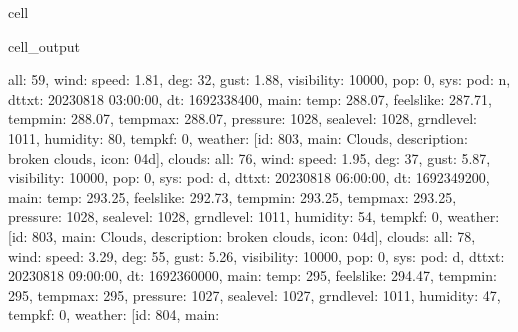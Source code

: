 \documentclass[letterpaper,10pt,english]{jupyterBook}
\begin{document}
\begin{sphinxuseclass}{cell}
\begin{sphinxVerbatimOutput}
\begin{sphinxuseclass}{cell_output}
\begin{sphinxVerbatim}[commandchars=\\\{\}]
\PYGZob{}\PYGZsq{}all\PYGZsq{}: 59\PYGZcb{}, \PYGZsq{}wind\PYGZsq{}: \PYGZob{}\PYGZsq{}speed\PYGZsq{}: 1.81, \PYGZsq{}deg\PYGZsq{}: 32, \PYGZsq{}gust\PYGZsq{}: 1.88\PYGZcb{}, \PYGZsq{}visibility\PYGZsq{}: 10000, \PYGZsq{}pop\PYGZsq{}: 0, \PYGZsq{}sys\PYGZsq{}: \PYGZob{}\PYGZsq{}pod\PYGZsq{}: \PYGZsq{}n\PYGZsq{}\PYGZcb{}, \PYGZsq{}dt\PYGZus{}txt\PYGZsq{}: \PYGZsq{}2023\PYGZhy{}08\PYGZhy{}18 03:00:00\PYGZsq{}\PYGZcb{}, \PYGZob{}\PYGZsq{}dt\PYGZsq{}: 1692338400, \PYGZsq{}main\PYGZsq{}: \PYGZob{}\PYGZsq{}temp\PYGZsq{}: 288.07, \PYGZsq{}feels\PYGZus{}like\PYGZsq{}: 287.71, \PYGZsq{}temp\PYGZus{}min\PYGZsq{}: 288.07, \PYGZsq{}temp\PYGZus{}max\PYGZsq{}: 288.07, \PYGZsq{}pressure\PYGZsq{}: 1028, \PYGZsq{}sea\PYGZus{}level\PYGZsq{}: 1028, \PYGZsq{}grnd\PYGZus{}level\PYGZsq{}: 1011, \PYGZsq{}humidity\PYGZsq{}: 80, \PYGZsq{}temp\PYGZus{}kf\PYGZsq{}: 0\PYGZcb{}, \PYGZsq{}weather\PYGZsq{}: [\PYGZob{}\PYGZsq{}id\PYGZsq{}: 803, \PYGZsq{}main\PYGZsq{}: \PYGZsq{}Clouds\PYGZsq{}, \PYGZsq{}description\PYGZsq{}: \PYGZsq{}broken clouds\PYGZsq{}, \PYGZsq{}icon\PYGZsq{}: \PYGZsq{}04d\PYGZsq{}\PYGZcb{}], \PYGZsq{}clouds\PYGZsq{}: \PYGZob{}\PYGZsq{}all\PYGZsq{}: 76\PYGZcb{}, \PYGZsq{}wind\PYGZsq{}: \PYGZob{}\PYGZsq{}speed\PYGZsq{}: 1.95, \PYGZsq{}deg\PYGZsq{}: 37, \PYGZsq{}gust\PYGZsq{}: 5.87\PYGZcb{}, \PYGZsq{}visibility\PYGZsq{}: 10000, \PYGZsq{}pop\PYGZsq{}: 0, \PYGZsq{}sys\PYGZsq{}: \PYGZob{}\PYGZsq{}pod\PYGZsq{}: \PYGZsq{}d\PYGZsq{}\PYGZcb{}, \PYGZsq{}dt\PYGZus{}txt\PYGZsq{}: \PYGZsq{}2023\PYGZhy{}08\PYGZhy{}18 06:00:00\PYGZsq{}\PYGZcb{}, \PYGZob{}\PYGZsq{}dt\PYGZsq{}: 1692349200, \PYGZsq{}main\PYGZsq{}: \PYGZob{}\PYGZsq{}temp\PYGZsq{}: 293.25, \PYGZsq{}feels\PYGZus{}like\PYGZsq{}: 292.73, \PYGZsq{}temp\PYGZus{}min\PYGZsq{}: 293.25, \PYGZsq{}temp\PYGZus{}max\PYGZsq{}: 293.25, \PYGZsq{}pressure\PYGZsq{}: 1028, \PYGZsq{}sea\PYGZus{}level\PYGZsq{}: 1028, \PYGZsq{}grnd\PYGZus{}level\PYGZsq{}: 1011, \PYGZsq{}humidity\PYGZsq{}: 54, \PYGZsq{}temp\PYGZus{}kf\PYGZsq{}: 0\PYGZcb{}, \PYGZsq{}weather\PYGZsq{}: [\PYGZob{}\PYGZsq{}id\PYGZsq{}: 803, \PYGZsq{}main\PYGZsq{}: \PYGZsq{}Clouds\PYGZsq{}, \PYGZsq{}description\PYGZsq{}: \PYGZsq{}broken clouds\PYGZsq{}, \PYGZsq{}icon\PYGZsq{}: \PYGZsq{}04d\PYGZsq{}\PYGZcb{}], \PYGZsq{}clouds\PYGZsq{}: \PYGZob{}\PYGZsq{}all\PYGZsq{}: 78\PYGZcb{}, \PYGZsq{}wind\PYGZsq{}: \PYGZob{}\PYGZsq{}speed\PYGZsq{}: 3.29, \PYGZsq{}deg\PYGZsq{}: 55, \PYGZsq{}gust\PYGZsq{}: 5.26\PYGZcb{}, \PYGZsq{}visibility\PYGZsq{}: 10000, \PYGZsq{}pop\PYGZsq{}: 0, \PYGZsq{}sys\PYGZsq{}: \PYGZob{}\PYGZsq{}pod\PYGZsq{}: \PYGZsq{}d\PYGZsq{}\PYGZcb{}, \PYGZsq{}dt\PYGZus{}txt\PYGZsq{}: \PYGZsq{}2023\PYGZhy{}08\PYGZhy{}18 09:00:00\PYGZsq{}\PYGZcb{}, \PYGZob{}\PYGZsq{}dt\PYGZsq{}: 1692360000, \PYGZsq{}main\PYGZsq{}: \PYGZob{}\PYGZsq{}temp\PYGZsq{}: 295, \PYGZsq{}feels\PYGZus{}like\PYGZsq{}: 294.47, \PYGZsq{}temp\PYGZus{}min\PYGZsq{}: 295, \PYGZsq{}temp\PYGZus{}max\PYGZsq{}: 295, \PYGZsq{}pressure\PYGZsq{}: 1027, \PYGZsq{}sea\PYGZus{}level\PYGZsq{}: 1027, \PYGZsq{}grnd\PYGZus{}level\PYGZsq{}: 1011, \PYGZsq{}humidity\PYGZsq{}: 47, \PYGZsq{}temp\PYGZus{}kf\PYGZsq{}: 0\PYGZcb{}, \PYGZsq{}weather\PYGZsq{}: [\PYGZob{}\PYGZsq{}id\PYGZsq{}: 804, \PYGZsq{}main\PYGZsq{}: 
\end{sphinxVerbatim}
\end{sphinxuseclass}
\end{sphinxVerbatimOutput}
\end{sphinxuseclass}
\end{document}
